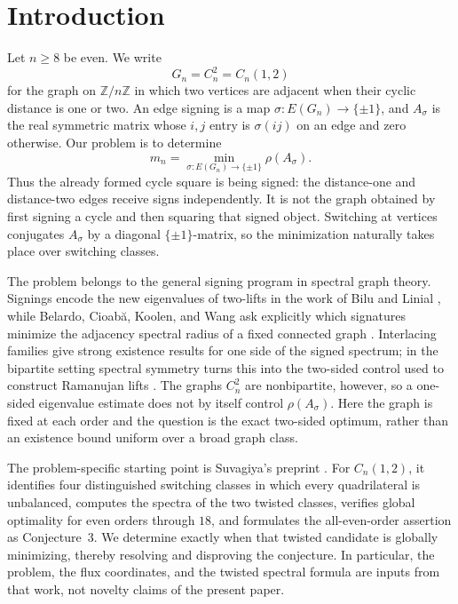 \section{Introduction}\label{sec:introduction}

Let \(n\geq8\) be even.  We write
\[
G_n=C_n^2=C_n(1,2)
\]
for the graph on \(\mathbb Z/n\mathbb Z\) in which two vertices are adjacent
when their cyclic distance is one or two.  An edge signing is a map
\(\sigma:E(G_n)\to\{\pm1\}\), and \(A_\sigma\) is the real symmetric matrix
whose \(i,j\) entry is \(\sigma(ij)\) on an edge and zero otherwise.  Our
problem is to determine
\[
m_n=\min_{\sigma:E(G_n)\to\{\pm1\}}\rho(A_\sigma).
\]
Thus the already formed cycle square is being signed: the distance-one and
distance-two edges receive signs independently.  It is not the graph obtained
by first signing a cycle and then squaring that signed object.  Switching at
vertices conjugates \(A_\sigma\) by a diagonal \(\{\pm1\}\)-matrix, so the
minimization naturally takes place over switching classes.

The problem belongs to the general signing program in spectral graph theory.
Signings encode the new eigenvalues of two-lifts in the work of Bilu and
Linial \cite{BiluLinial2006}, while Belardo, Cioab\u{a}, Koolen, and Wang ask
explicitly which signatures minimize the adjacency spectral radius of a fixed
connected graph \cite{BelardoCioabaKoolenWang2019}.  Interlacing families give
strong existence results for one side of the signed spectrum; in the
bipartite setting spectral symmetry turns this into the two-sided control
used to construct Ramanujan lifts \cite{MarcusSpielmanSrivastava2015}.  The
graphs \(C_n^2\) are nonbipartite, however, so a one-sided eigenvalue estimate
does not by itself control \(\rho(A_\sigma)\).  Here the graph is fixed at each
order and the question is the exact two-sided optimum, rather than an
existence bound uniform over a broad graph class.

The problem-specific starting point is Suvagiya's preprint
\cite[Conjecture~3]{Suvagiya2026Signed}.  For \(C_n(1,2)\), it identifies four distinguished
switching classes in which every quadrilateral is unbalanced, computes the
spectra of the two twisted classes, verifies global optimality for even orders
through \(18\), and formulates the all-even-order assertion as Conjecture~3.
We determine exactly when that twisted candidate is globally minimizing,
thereby resolving and disproving the conjecture.  In particular, the problem,
the flux coordinates, and the twisted spectral formula are inputs from that
work, not novelty claims of the present paper.

